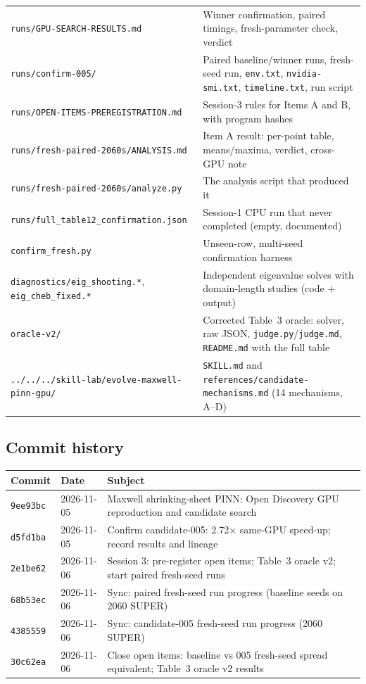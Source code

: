 \documentclass[11pt,a4paper]{article}
\newcommand{\code}[1]{\texttt{\small #1}}
\begin{document}
\begin{longtable}{@{}>{\raggedright\arraybackslash}p{7.0cm}>{\raggedright\arraybackslash}p{8.7cm}@{}}
\code{runs/GPU-SEARCH-RESULTS.md} & Winner confirmation, paired timings, fresh-parameter check, verdict \\
\code{runs/confirm-005/} & Paired baseline/winner runs, fresh-seed run, \code{env.txt}, \code{nvidia-smi.txt}, \code{timeline.txt}, run script \\
\code{runs/OPEN-ITEMS-PREREGISTRATION.md} & Session-3 rules for Items A and B, with program hashes \\
\code{runs/fresh-paired-2060s/ANALYSIS.md} & Item A result: per-point table, means/maxima, verdict, cross-GPU note \\
\code{runs/fresh-paired-2060s/analyze.py} & The analysis script that produced it \\
\code{runs/full\_table12\_confirmation.json} & Session-1 CPU run that never completed (empty, documented) \\
\code{confirm\_fresh.py} & Unseen-row, multi-seed confirmation harness \\
\code{diagnostics/eig\_shooting.*}, \code{eig\_cheb\_fixed.*} & Independent eigenvalue solves with domain-length studies (code $+$ output) \\
\code{oracle-v2/} & Corrected Table~3 oracle: solver, raw JSON, \code{judge.py}/\code{judge.md}, \code{README.md} with the full table \\
\code{../../../skill-lab/}\allowbreak\code{evolve-maxwell-pinn-gpu/} & \code{SKILL.md} and \code{references/candidate-mechanisms.md} (14 mechanisms, A--D) \\
\bottomrule
\end{longtable}

\subsection{Commit history}
\begin{table}[ht]
\centering
\small
\begin{tabular}{@{}llp{9.6cm}@{}}
\toprule
\textbf{Commit} & \textbf{Date} & \textbf{Subject} \\
\midrule
\code{9ee93bc} & 2026-11-05 & Maxwell shrinking-sheet PINN: Open Discovery GPU reproduction and candidate search \\
\code{d5fd1ba} & 2026-11-05 & Confirm candidate-005: 2.72$\times$ same-GPU speed-up; record results and lineage \\
\code{2e1be62} & 2026-11-06 & Session 3: pre-register open items; Table~3 oracle v2; start paired fresh-seed runs \\
\code{68b53ec} & 2026-11-06 & Sync: paired fresh-seed run progress (baseline seeds on 2060 SUPER) \\
\code{4385559} & 2026-11-06 & Sync: candidate-005 fresh-seed run progress (2060 SUPER) \\
\code{30c62ea} & 2026-11-06 & Close open items: baseline vs 005 fresh-seed spread equivalent; Table~3 oracle v2 results \\
\bottomrule
\end{tabular}
\end{table}
\end{document}
